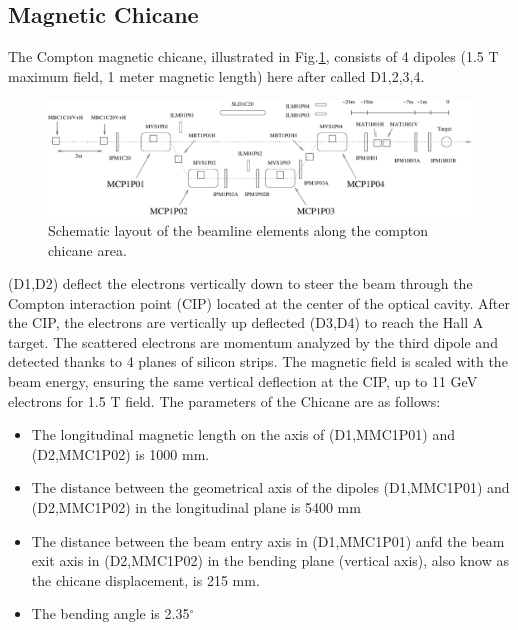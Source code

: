 \subsection{Magnetic Chicane}
\label{sec:compton_chicane}

The Compton magnetic chicane, illustrated in Fig.\ref{fig:compton_chicane}, consists of 4 dipoles (1.5 T maximum field, 1 meter magnetic length) here after called D1,2,3,4.

\begin{figure}[htp]
    \begin{center}
        \includegraphics*[angle=-90,scale=0.9]{compton_chicane}
    \end{center}
    \caption[compton:chicane schematic]{
            Schematic layout of the beamline elements along the compton chicane area.
            }
    \label{fig:compton_chicane}
 \end{figure}
(D1,D2) deflect  the electrons  vertically down to steer
the beam through the Compton interaction point (CIP) located at the center of
the optical cavity. After the CIP, the electrons are vertically up deflected (D3,D4) to reach
the Hall A target. The scattered electrons are momentum analyzed by the third dipole and
detected thanks to 4 planes of silicon strips.
The magnetic field is scaled with the beam energy, ensuring the same vertical deflection at the CIP,
up to 11 GeV electrons for 1.5 T field. The parameters of the Chicane are as follows:
\begin{itemize}
	\item The longitudinal magnetic length on the axis of (D1,MMC1P01) and
	(D2,MMC1P02) is 1000 mm.
       \item The distance between the geometrical axis of the
        dipoles (D1,MMC1P01) and (D2,MMC1P02) in the longitudinal plane is 5400 mm
	\item The distance between the beam entry axis in (D1,MMC1P01) anfd the
        beam exit axis in (D2,MMC1P02) in the bending plane (vertical axis), also know as the chicane displacement, is 215 mm.
       \item The bending angle is 2.35$^{\circ}$
\end{itemize}

